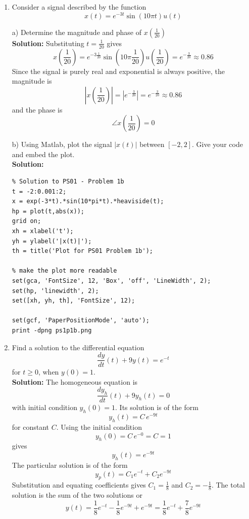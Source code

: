 \begin{enumerate}

\item Consider a signal described by the function
  \[
  x(t) = e^{-3t}\sin(10\pi t)u(t)
  \]

  a) Determine the magnitude and phase of $x\left( \frac{1}{20}\right)$\\
  \textbf{Solution:}
  Substituting $t = \frac{1}{20}$ gives
  \[
  x\left( \frac{1}{20}\right) = e^{-3\frac{1}{20}}\sin\left(10\pi \frac{1}{20}\right)u\left( \frac{1}{20}\right) = e^{-\frac{3}{20}} \approx 0.86
  \]
  Since the signal is purely real and exponential is always positive, the magnitude is
  \[
  \left|x\left( \frac{1}{20}\right)\right| = \left| e^{-\frac{3}{20}}\right| =  e^{-\frac{3}{20}}  \approx 0.86
  \]
  and the phase is
  \[
  \angle x\left( \frac{1}{20}\right) = 0
  \]

  b) Using Matlab, plot the signal $|x(t)|$ between $[-2, 2]$. Give your code and embed the plot.\\

  \textbf{Solution:}
\begin{verbatim}
% Solution to PS01 - Problem 1b
t = -2:0.001:2;
x = exp(-3*t).*sin(10*pi*t).*heaviside(t);
hp = plot(t,abs(x));
grid on;
xh = xlabel('t');
yh = ylabel('|x(t)|');
th = title('Plot for PS01 Problem 1b');

% make the plot more readable
set(gca, 'FontSize', 12, 'Box', 'off', 'LineWidth', 2);
set(hp, 'linewidth', 2);
set([xh, yh, th], 'FontSize', 12);

set(gcf, 'PaperPositionMode', 'auto');
print -dpng ps1p1b.png
\end{verbatim}

  \item Find a solution to the differential equation
  \[
  \frac{dy}{dt}(t) + 9y(t) = e^{-t}
  \]
  for $t \geq 0$, when $y(0) = 1$.\\

  \textbf{Solution:}
  The homogeneous equation is
  \[
  \frac{dy_h}{dt}(t) + 9y_h(t) = 0
  \]
  with initial condition $y_h(0) = 1$. Its solution is of the form
  \[
  y_h(t) = C\, e^{-9t} 
  \]
  for constant $C$. Using the initial condition
  \[
  y_h(0) = C\, e^{-0} = C = 1
  \]
  gives
  \[
  y_h(t) = e^{-9t} 
  \]
  The particular solution is of the form
  \[
  y_p(t) = C_1 e^{-t} + C_2 e^{-9t}
  \]
  Substitution and equating coefficients gives $C_1 = \frac{1}{8}$ and $C_2 = -\frac{1}{8}$. The total solution is the sum of the two solutions or
  \[
  y(t) = \frac{1}{8} e^{-t} - \frac{1}{8} e^{-9t} + e^{-9t} = \frac{1}{8} e^{-t} + \frac{7}{8} e^{-9t}
  \]


\end{enumerate}
